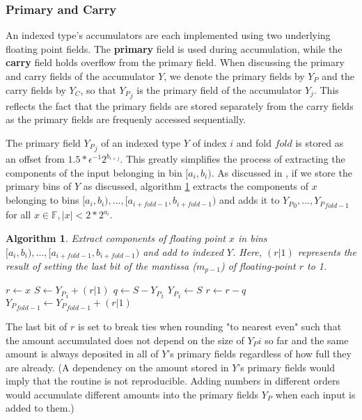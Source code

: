 \documentclass[12pt]{article}
\providecommand{\F}{\ensuremath{\mathbb{F}}}
\theoremstyle{plain}
\newtheorem{alg}{Algorithm}[section]
\begin{document}
    \subsubsection{Primary and Carry}
      An indexed type's accumulators are each implemented using two underlying floating point fields. The \textbf{primary} field is used during accumulation, while the \textbf{carry} field holds overflow from the primary field. When discussing the primary and carry fields of the accumulator $Y$, we denote the primary fields by $Y_P$ and the carry fields by $Y_C$, so that ${Y_P}_j$ is the primary field of the accumulator $Y_j$. This reflects the fact that the primary fields are stored separately from the carry fields as the primary fields are frequenly accessed sequentially.

      The primary field ${Y_P}_j$ of an indexed type $Y$ of index $i$ and fold $fold$ is stored as an offset from $1.5 * \epsilon^{-1} 2^{b_{i + j}}$. This greatly simplifies the process of extracting the components of the input belonging in bin $[a_i, b_i)$. As discussed in \cite{repsum}, if we store the primary bins of $Y$ as discussed, algorithm \ref{alg:deposit} extracts the components of $x$ belonging to bins $[a_i, b_i), ..., [a_{i + fold - 1}, b_{i + fold - 1})$ and adds it to ${Y_P}_0, ..., {Y_P}_{fold - 1}$ for all $x \in \F, |x| < 2 * 2^{a_i}$.
      \begin{alg}
        Extract components of floating point $x$ in bins $[a_i, b_i), ..., [a_{i + fold - 1}, b_{i + fold - 1})$ and add to indexed $Y$. Here, $(r | 1)$ represents the result of setting the last bit of the mantissa ($m_{p - 1}$) of floating-point $r$ to 1.
        \begin{algorithmic}
            \State $r \gets x$
              \State $S \gets {Y_P}_i + (r | 1)$
              \State $q \gets S - {Y_P}_i$
              \State ${Y_P}_i \gets S$
              \State $r \gets r - q$
            \EndFor
            \State ${Y_P}_{fold - 1} \gets {Y_P}_{fold - 1} + (r | 1)$
          \EndFunction
        \end{algorithmic}
        \label{alg:deposit}
      \end{alg}
      The last bit of $r$ is set to break ties when rounding "to nearest even" such that the amount accumulated does not depend on the size of ${Y_P}i$ so far and the same amount is always deposited in all of $Y$'s primary fields regardless of how full they are already. (A dependency on the amount stored in $Y$'s primary fields would imply that the routine is not reproducible. Adding numbers in different orders would accumulate different amounts into the primary fields $Y_P$ when each input is added to them.)
\end{document}
